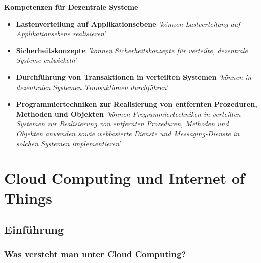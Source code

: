 \documentclass[letterpaper, 12pt]{article}
\let\tempsection\section
\renewcommand\section[1]{\vspace{-0.3cm}\tempsection{#1}\vspace{-0.3cm}}
\let\tempsubsection\subsection
\renewcommand\subsection[1]{\vspace{0cm}\tempsubsection{#1}\vspace{0cm}}
\let\tempsubsubsection\subsubsection
\renewcommand\subsubsection[1]{\vspace{0cm}\tempsubsubsection{#1}\vspace{0cm}}
\begin{document}
\parindent 0pt
\parskip 6pt



\clearpage
\thispagestyle{empty}
\tableofcontents

\newpage
{}
\pagestyle{fancy}

\textbf{Kompetenzen für Dezentrale Systeme}

\begin{itemize}
	\item	\textbf{Lastenverteilung auf Applikationsebene} \newline
	\textit{'können Lastverteilung auf Applikationsebene realisieren'}
	\item 	\textbf{Sicherheitskonzepte} \newline
	\textit{'können Sicherheitskonzepte für verteilte, dezentrale Systeme entwickeln'}
	\item 	\textbf{Durchführung von Transaktionen in verteilten Systemen} \newline
	\textit{'können in dezentralen Systemen Transaktionen durchführen'}
	\item	\textbf{Programmiertechniken zur Realisierung von entfernten Prozeduren, Methoden und Objekten} \newline
	\textit{'können Programmiertechniken in verteilten Systemen zur Realisierung von entfernten Prozeduren, Methoden und Objekten anwenden sowie webbasierte Dienste und Messaging-Dienste in solchen Systemen implementieren'}
\end{itemize}

\clearpage

\section{Cloud Computing und Internet of Things}

\subsection{Einführung}

\subsubsection{Was versteht man unter Cloud Computing?}
\end{document}
